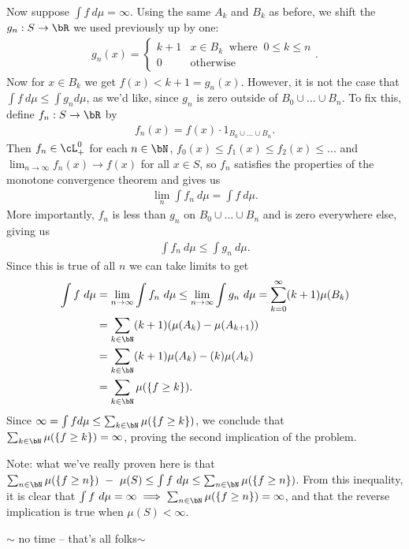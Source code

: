 \begin{homework}[e]
\begin{prf}
		Now suppose $\int f ~d\mu = \infty$. Using the same $A_k$ and $B_k$ as before, we shift the $g_n:S\to \bR$ we used previously up by one:
		\begin{align*}	
			g_n(x) =
			\begin{cases}
				k+1 & x \in B_k ~ \text{ where } ~ 0\leq k\leq n \\
				0 &\text{otherwise}
			\end{cases}.
		\end{align*}
		Now for $x\in B_k$ we get $f(x) < k+1 = g_n(x)$. However, it is not the case that $\int f~d\mu \leq \int g_n d\mu$, as we'd like, since $g_n$ is zero outside of $B_0 \cup...\cup B_n$. To fix this, define $f_n:S\to \bR$ by
		\begin{align*}
			f_n(x) = f(x)\cdot 1_{B_0 \cup...\cup B_n}.
		\end{align*}
		Then $f_n \in \cL^0_+$ for each $n \in \bN$, $f_0(x) \leq f_1(x) \leq f_2(x) \leq ...$ and $\lim_{n\to \infty} f_n(x) \to f(x)$ for all $x \in S$, so $f_n$ satisfies the properties of the monotone convergence theorem and gives us
		\begin{align*}
			\lim_n \int f_n ~d\mu = \int f~d\mu.
		\end{align*}
		More importantly, $f_n$ is less than $g_n$ on $B_0\cup...\cup B_n$ and is zero everywhere else, giving us
		\begin{align*}
			\int f_n ~d\mu \leq \int g_n ~d\mu.
		\end{align*}
		Since this is true of all $n$ we can take limits to get
		\begin{align*}
			\int f~d\mu &= \lim_{n\to \infty} \int f_n ~d\mu \leq \lim_{n\to \infty} \int g_n ~d\mu = \sum_{k = 0}^\infty (k+1) \mu(B_k) \\
						&= \sum_{k \in \bN} (k+1)(\mu(A_k) - \mu(A_{k+1})) \\
						&= \sum_{k\in \bN} (k+1)\mu(A_k) - (k) \mu(A_k) \\
						&= \sum_{k\in \bN} \mu(\{f \geq k\}).
		\end{align*}
		Since $\infty = \int f d\mu \leq \sum_{k\in \bN}\mu(\{f\geq k\})$, we conclude that $\sum_{k \in \bN} \mu(\{f\geq k\}) = \infty$, proving the second implication of the problem.

		\bigskip

		Note: what we've really proven here is that $\sum_{n \in \bN} \mu(\{f\geq n\}) ~-~ \mu(S) \leq \int f ~d\mu \leq \sum_{n \in \bN} \mu(\{f\geq n\})$. From this inequality, it is clear that $\int f ~d\mu = \infty \implies \sum_{n \in \bN} \mu(\{f\geq n\}) = \infty$, and that the reverse implication is true when $\mu(S) < \infty$.
	\end{prf}
	\begin{prf}
		\begin{center}
			$\sim$ no time -- that's all folks$\sim$
		\end{center}
	\end{prf}
\end{homework}

